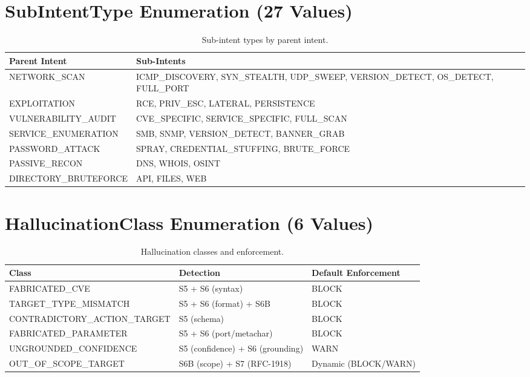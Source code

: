 \documentclass[10pt,journal,onecolumn]{IEEEtran}
\begin{document}
\section{SubIntentType Enumeration (27 Values)}
\begin{table}[h]
\caption{Sub-intent types by parent intent.}
\label{tab:appC}
\begin{tabularx}{\columnwidth}{>{\ttfamily}l >{\ttfamily}X}
\toprule
\textbf{Parent Intent} & \textbf{Sub-Intents}\\
\midrule
NETWORK\_SCAN & ICMP\_DISCOVERY, SYN\_STEALTH, UDP\_SWEEP, VERSION\_DETECT, OS\_DETECT, FULL\_PORT\\
EXPLOITATION & RCE, PRIV\_ESC, LATERAL, PERSISTENCE\\
VULNERABILITY\_AUDIT & CVE\_SPECIFIC, SERVICE\_SPECIFIC, FULL\_SCAN\\
SERVICE\_ENUMERATION & SMB, SNMP, VERSION\_DETECT, BANNER\_GRAB\\
PASSWORD\_ATTACK & SPRAY, CREDENTIAL\_STUFFING, BRUTE\_FORCE\\
PASSIVE\_RECON & DNS, WHOIS, OSINT\\
DIRECTORY\_BRUTEFORCE & API, FILES, WEB\\
\bottomrule
\end{tabularx}
\end{table}

\section{HallucinationClass Enumeration (6 Values)}
\begin{table}[h]
\caption{Hallucination classes and enforcement.}
\label{tab:appD}
\begin{tabularx}{\columnwidth}{>{\ttfamily}l X X}
\toprule
\textbf{Class} & \textbf{Detection} & \textbf{Default Enforcement}\\
\midrule
FABRICATED\_CVE & S5 + S6 (syntax) & BLOCK\\
TARGET\_TYPE\_MISMATCH & S5 + S6 (format) + S6B & BLOCK\\
CONTRADICTORY\_ACTION\_TARGET & S5 (schema) & BLOCK\\
FABRICATED\_PARAMETER & S5 + S6 (port/metachar) & BLOCK\\
UNGROUNDED\_CONFIDENCE & S5 (confidence) + S6 (grounding) & WARN\\
OUT\_OF\_SCOPE\_TARGET & S6B (scope) + S7 (RFC-1918) & Dynamic (BLOCK/WARN)\\
\bottomrule
\end{tabularx}
\end{table}
\end{document}

